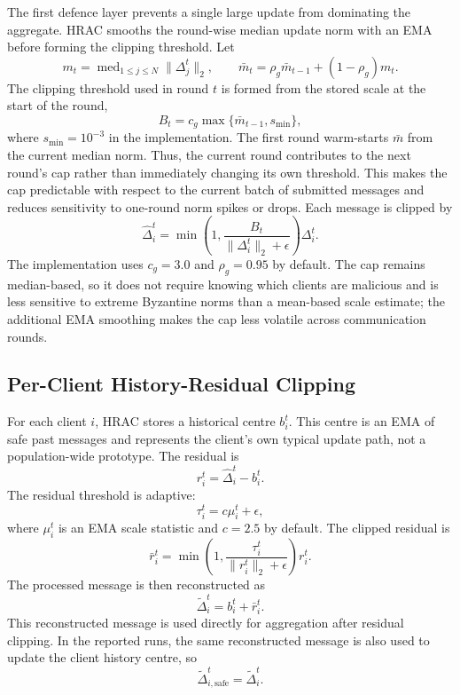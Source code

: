 The first defence layer prevents a single large update from dominating the
aggregate. HRAC smooths the round-wise median update norm with an EMA before
forming the clipping threshold. Let
\[
    m_t = \operatorname{med}_{1\leq j\leq N}\|\Delta_j^t\|_2,
    \qquad
    \bar m_t = \rho_g \bar m_{t-1} + (1-\rho_g)m_t .
\]
The clipping threshold used in round $t$ is formed from the stored scale at the
start of the round,
\[
    B_t = c_g\max\{\bar m_{t-1},s_{\min}\},
\]
where \(s_{\min}=10^{-3}\) in the implementation. The first round warm-starts
\(\bar m\) from the current median norm. Thus,
the current round contributes to the next round's cap rather than immediately
changing its own threshold. This makes the cap predictable with respect to the
current batch of submitted messages and reduces sensitivity to one-round norm
spikes or drops. Each message is clipped by
\begin{equation}
    \hat{\Delta}_i^t
    =
    \min\!\left(1,\frac{B_t}{\|\Delta_i^t\|_2+\epsilon}\right)\Delta_i^t .
\end{equation}
The implementation uses $c_g=3.0$ and $\rho_g=0.95$ by default. The cap remains
median-based, so it does not require knowing which clients are malicious and is
less sensitive to extreme Byzantine norms than a mean-based scale estimate; the
additional EMA smoothing makes the cap less volatile across communication
rounds.

\subsection{Per-Client History-Residual Clipping}

For each client $i$, HRAC stores a historical centre $b_i^t$. This centre is an
EMA of safe past messages and represents the client's own typical update path,
not a population-wide prototype. The residual is
\begin{equation}
    r_i^t = \hat{\Delta}_i^t - b_i^t .
\end{equation}
The residual threshold is adaptive:
\begin{equation}
    \tau_i^t = c\mu_i^t + \epsilon ,
\end{equation}
where $\mu_i^t$ is an EMA scale statistic and $c=2.5$ by default. The clipped
residual is
\begin{equation}
    \bar r_i^t
    =
    \min\!\left(1,\frac{\tau_i^t}{\|r_i^t\|_2+\epsilon}\right)r_i^t .
\end{equation}
The processed message is then reconstructed as
\begin{equation}
    \tilde{\Delta}_i^t = b_i^t + \bar r_i^t .
\end{equation}
This reconstructed message is used directly for aggregation after residual
clipping.
In the reported runs, the same reconstructed message is also used to update the
client history centre, so
\[
    \tilde{\Delta}_{i,\mathrm{safe}}^t=\tilde{\Delta}_i^t .
\]

